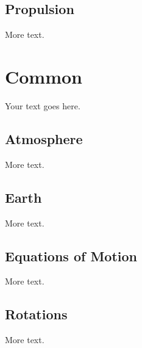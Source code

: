 \documentclass[11pt]{article} %
\begin{document}
\subsection{Propulsion}

More text.

\section{Common}

Your text goes here.

\subsection{Atmosphere}

More text.

\subsection{Earth}

More text.

\subsection{Equations of Motion}

More text.

\subsection{Rotations}

More text.
\end{document}
